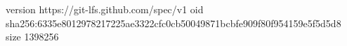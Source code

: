 version https://git-lfs.github.com/spec/v1
oid sha256:6335e8012978217225ae3322cfc0cb50049871bcbfe909f80f954159e5f5d5d8
size 1398256
